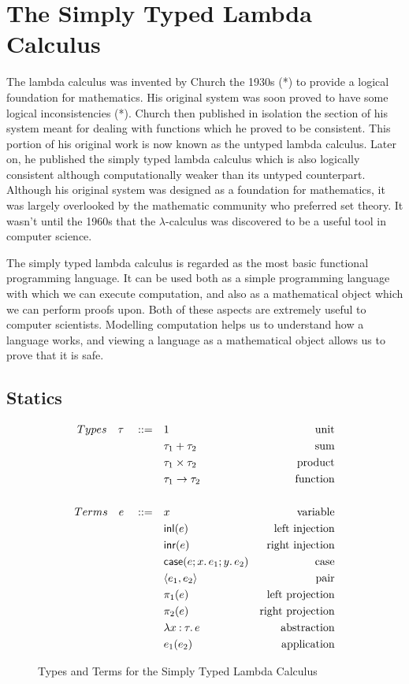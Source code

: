 \chapter{The Simply Typed Lambda Calculus}
\label{chap: stlc}

The lambda calculus was invented by Church the 1930s (*) to provide a logical foundation for 
mathematics. His original system was soon proved to have some logical inconsistencies (*). 
Church then published in isolation the section of his system meant for dealing with functions 
which he proved to be consistent. This portion of his original work is now known as the untyped 
lambda calculus. Later on, he published the simply typed lambda calculus which is also logically 
consistent although computationally weaker than its untyped counterpart. Although his original 
system was designed as a foundation for mathematics, it was largely overlooked by the mathematic 
community who preferred set theory. It wasn't until the 1960s that the $\lambda$-calculus was 
discovered to be a useful tool in computer science.

The simply typed lambda calculus is regarded as the most basic functional programming language. 
It can be used both as a simple programming language with which we can execute computation, and 
also as a mathematical object which we can perform proofs upon. Both of these aspects are 
extremely useful to computer scientists. Modelling computation helps us to understand how a 
language works, and viewing a language as a mathematical object allows us to prove that it 
is safe. 

\section{Statics}

\begin{figure}[h]
    \begin{align*}
        Types \quad \tau \quad ::= \quad & 1 &\text{unit} \\
        & \tau_1 + \tau_2 &\text{sum} \\
        & \tau_1 \times \tau_2 &\text{product} \\
        & \tau_1 \rightarrow \tau_2 &\text{function} \\
        \\
        Terms \quad e \quad ::= \quad & x &\text{variable} \\
        & \LamInl{e} &\text{left injection} \\
        & \LamInr{e} &\text{right injection} \\
        & \LamCase{e}{x}{e_1}{y}{e_2} &\text{case} \\
        & \Tuple{e_1}{e_2} &\text{pair} \\
        & \Proj{e} &\text{left projection} \\
        & \Proj[2]{e} &\text{right projection} \\
        & \Lam{x}[\tau]{e} &\text{abstraction} \\
        & e_1 (e_2) &\text{application}
    \end{align*}
    \caption{Types and Terms for the Simply Typed Lambda Calculus}
    \label{fig: tt stlc}
\end{figure}

